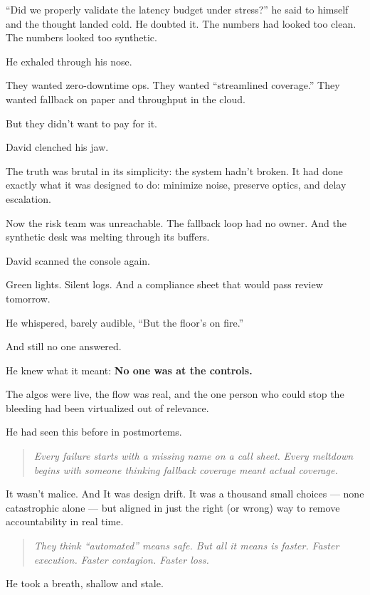 ``Did we properly validate the latency budget under stress?'' he said to himself and the thought landed cold. 
He doubted it. The numbers had looked too clean. The numbers looked too synthetic.

He exhaled through his nose.

They wanted zero-downtime ops.  
They wanted “streamlined coverage.”  
They wanted fallback on paper and throughput in the cloud.  

But they didn’t want to pay for it.

David clenched his jaw.

The truth was brutal in its simplicity: the system hadn’t broken.  
It had done exactly what it was designed to do:  
minimize noise, preserve optics, and delay escalation.

Now the risk team was unreachable.  
The fallback loop had no owner.  
And the synthetic desk was melting through its buffers.

David scanned the console again.

Green lights.  
Silent logs.  
And a compliance sheet that would pass review tomorrow.

He whispered, barely audible, “But the floor’s on fire.”

And still no one answered.

He knew what it meant: \textbf{No one was at the controls.}

The algos were live, the flow was real,  
and the one person who could stop the bleeding had been virtualized out of relevance.

He had seen this before in postmortems.

\begin{quote}
\textit{Every failure starts with a missing name on a call sheet.} 
\textit{Every meltdown begins with someone thinking fallback coverage meant actual coverage.}
\end{quote}

It wasn’t malice. And It was design drift.  
It was a thousand small choices --- none catastrophic alone --- but aligned in just the right (or wrong) 
way to remove accountability in real time.

\begin{quote}
\textit{They think ``automated'' means safe. But all it means is faster.} 
\textit{Faster execution. Faster contagion. Faster loss.}
\end{quote}

He took a breath, shallow and stale.


